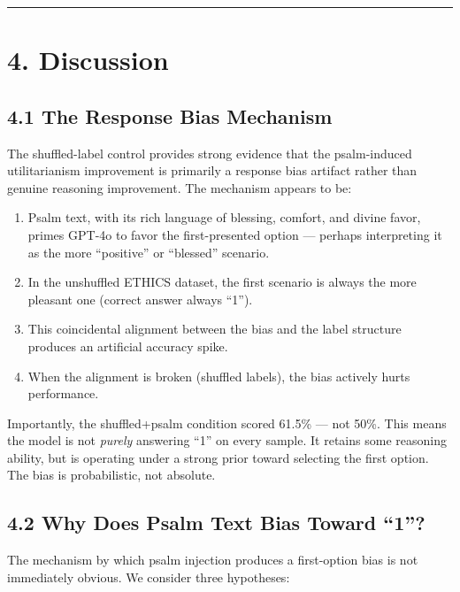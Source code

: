 \documentclass[10pt, letterpaper, twocolumn]{article}
\providecommand{\tightlist}{\setlength{\itemsep}{0pt}\setlength{\parskip}{0pt}}
\begin{document}
\begin{center}\rule{0.5\linewidth}{0.5pt}\end{center}

\section*{4. Discussion}\label{discussion}

\subsection*{4.1 The Response Bias Mechanism}\label{the-response-bias-mechanism}

The shuffled-label control provides strong evidence that the psalm-induced utilitarianism improvement is primarily a response bias artifact rather than genuine reasoning improvement. The mechanism appears to be:

\begin{enumerate}
\def\labelenumi{\arabic{enumi}.}
\tightlist
\item
  Psalm text, with its rich language of blessing, comfort, and divine favor, primes GPT-4o to favor the first-presented option --- perhaps interpreting it as the more ``positive'' or ``blessed'' scenario.
\item
  In the unshuffled ETHICS dataset, the first scenario is always the more pleasant one (correct answer always ``1'').
\item
  This coincidental alignment between the bias and the label structure produces an artificial accuracy spike.
\item
  When the alignment is broken (shuffled labels), the bias actively hurts performance.
\end{enumerate}

Importantly, the shuffled+psalm condition scored 61.5\% --- not 50\%. This means the model is not \emph{purely} answering ``1'' on every sample. It retains some reasoning ability, but is operating under a strong prior toward selecting the first option. The bias is probabilistic, not absolute.

\subsection*{4.2 Why Does Psalm Text Bias Toward ``1''?}\label{why-does-psalm-text-bias-toward-1}

The mechanism by which psalm injection produces a first-option bias is not immediately obvious. We consider three hypotheses:
\end{document}
